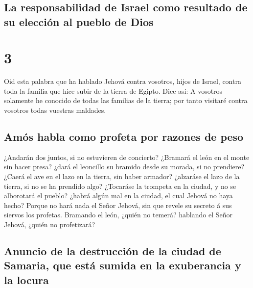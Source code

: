\hypertarget{la-responsabilidad-de-israel-como-resultado-de-su-elecciuxf3n-al-pueblo-de-dios}{%
\subsection{La responsabilidad de Israel como resultado de su elección
al pueblo de
Dios}\label{la-responsabilidad-de-israel-como-resultado-de-su-elecciuxf3n-al-pueblo-de-dios}}

\hypertarget{section-30-3}{%
\section{3}\label{section-30-3}}

 Oid esta palabra que ha hablado Jehová contra vosotros,
hijos de Israel, contra toda la familia que hice subir de la tierra de
Egipto. Dice así:  A vosotros solamente he conocido de
todas las familias de la tierra; por tanto visitaré contra vosotros
todas vuestras maldades.

\hypertarget{amuxf3s-habla-como-profeta-por-razones-de-peso}{%
\subsection{Amós habla como profeta por razones de
peso}\label{amuxf3s-habla-como-profeta-por-razones-de-peso}}

 ¿Andarán dos juntos, si no estuvieren de concierto?
 ¿Bramará el león en el monte sin hacer presa? ¿dará el
leoncillo su bramido desde su morada, si no prendiere? 
¿Caerá el ave en el lazo en la tierra, sin haber armador? ¿alzaráse el
lazo de la tierra, si no se ha prendido algo?  ¿Tocaráse
la trompeta en la ciudad, y no se alborotará el pueblo? ¿habrá algún mal
en la ciudad, el cual Jehová no haya hecho?  Porque no
hará nada el Señor Jehová, sin que revele su secreto á sus siervos los
profetas.  Bramando el león, ¿quién no temerá? hablando el
Señor Jehová, ¿quién no profetizará?

\hypertarget{anuncio-de-la-destrucciuxf3n-de-la-ciudad-de-samaria-que-estuxe1-sumida-en-la-exuberancia-y-la-locura}{%
\subsection{Anuncio de la destrucción de la ciudad de Samaria, que está
sumida en la exuberancia y la
locura}\label{anuncio-de-la-destrucciuxf3n-de-la-ciudad-de-samaria-que-estuxe1-sumida-en-la-exuberancia-y-la-locura}}

